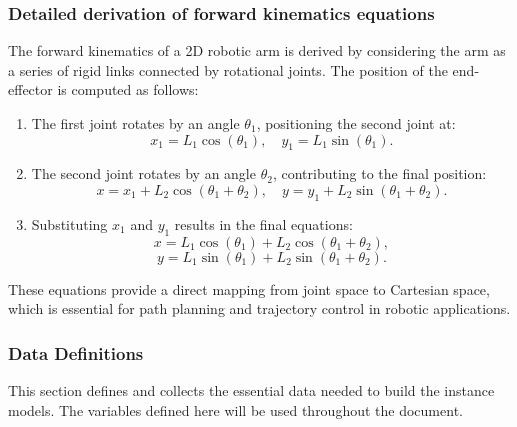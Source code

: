\documentclass[12pt]{article}
\begin{document}
\subsubsection*{Detailed derivation of forward kinematics equations}
The forward kinematics of a 2D robotic arm is derived by considering the arm as a series of rigid links connected by rotational joints. The position of the end-effector is computed as follows:

\begin{enumerate}
    \item The first joint rotates by an angle $\theta_1$, positioning the second joint at:
    \[
    x_1 = L_1 \cos(\theta_1), \quad y_1 = L_1 \sin(\theta_1).
    \]
    \item The second joint rotates by an angle $\theta_2$, contributing to the final position:
    \[
    x = x_1 + L_2 \cos(\theta_1 + \theta_2), \quad y = y_1 + L_2 \sin(\theta_1 + \theta_2).
    \]
    \item Substituting $x_1$ and $y_1$ results in the final equations:
    \[
    x = L_1 \cos(\theta_1) + L_2 \cos(\theta_1 + \theta_2),
    \]
    \[
    y = L_1 \sin(\theta_1) + L_2 \sin(\theta_1 + \theta_2).
    \]
\end{enumerate}

These equations provide a direct mapping from joint space to Cartesian space, which is essential for path planning and trajectory control in robotic applications.

\subsubsection{Data Definitions}\label{sec_datadef}

This section defines and collects the essential data needed to build the instance models. The variables defined here will be used throughout the document.
\end{document}
